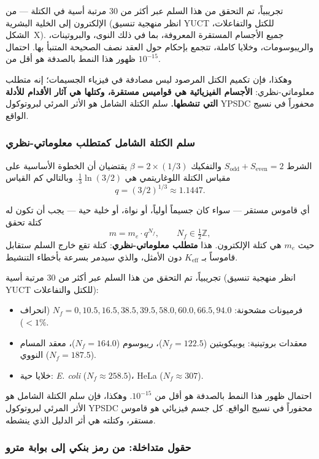 \documentclass[12pt,a4paper]{article}
\theoremstyle{remark}
\begin{document}
	تجريبياً، تم التحقق من هذا السلم عبر أكثر من 30 مرتبة أسية في الكتلة — من الإلكترون إلى الخلية البشرية (انظر منهجية تنسيق YUCT للكتل والتفاعلات، الشكل~X). جميع الأجسام المستقرة المعروفة، بما في ذلك النوى، والبروتينات، والريبوسومات، وخلايا كاملة، تتجمع بإحكام حول العقد نصف الصحيحة المتنبأ بها. احتمال ظهور هذا النمط بالصدفة هو أقل من \(10^{-15}\).
	
	وهكذا، فإن تكميم الكتل المرصود ليس مصادفة في فيزياء الجسيمات؛ إنه متطلب معلوماتي-نظري: \textbf{الأجسام الفيزيائية هي قواميس مستقرة، وكتلها هي آثار الأقدام للأدلة التي تنشطها.} سلم الكتلة الشامل هو الأثر المرئي لبروتوكول YPSDC محفوراً في نسيج الواقع.
	
	\subsubsection{سلم الكتلة الشامل كمتطلب معلوماتي-نظري}
	
	الشرط \(S_{\mathrm{odd}} + S_{\mathrm{even}} = 2\) والتفكيك \(\beta = 2 \times (1/3)\) يقتضيان أن الخطوة الأساسية على مقياس الكتلة اللوغاريتمي هي \(\frac{1}{3}\ln(3/2)\). وبالتالي كم القياس
	\[
	q = (3/2)^{1/3} \approx 1.1447.
	\]
	
	أي قاموس مستقر — سواء كان جسيماً أولياً، أو نواة، أو خلية حية — يجب أن تكون له كتلة تحقق
	\[
	m = m_e \cdot q^{N_f}, \qquad N_f \in \tfrac{1}{2}\mathbb{Z},
	\]
	حيث \(m_e\) هي كتلة الإلكترون. هذا \textbf{متطلب معلوماتي-نظري}: كتلة تقع خارج السلم ستقابل قاموساً بـ \(K_{\mathrm{eff}}\) دون الأمثل، والذي سيدمر بسرعة بأخطاء التنشيط.
	
	تجريبياً، تم التحقق من هذا السلم عبر أكثر من 30 مرتبة أسية (انظر منهجية تنسيق YUCT للكتل والتفاعلات):
	\begin{itemize}
		\item فرميونات مشحونة: \(N_f = 0, 10.5, 16.5, 38.5, 39.5, 58.0, 60.0, 66.5, 94.0\) (انحراف \(< 1\%\)).
		\item معقدات بروتينية: يوبيكويتين (\(N_f = 122.5\))، ريبوسوم (\(N_f = 164.0\))، معقد المسام النووي (\(N_f = 187.5\)).
		\item خلايا حية: \textit{E. coli} (\(N_f \approx 258.5\))، HeLa (\(N_f \approx 307\)).
	\end{itemize}
	
	احتمال ظهور هذا النمط بالصدفة هو أقل من \(10^{-15}\). وهكذا، فإن سلم الكتلة الشامل هو الأثر المرئي لبروتوكول YPSDC محفوراً في نسيج الواقع. كل جسم فيزيائي هو قاموس مستقر، وكتلته هي أثر الدليل الذي ينشطه.
	
	\subsubsection{حقول متداخلة: من رمز بنكي إلى بوابة مترو}
	
\end{document}
